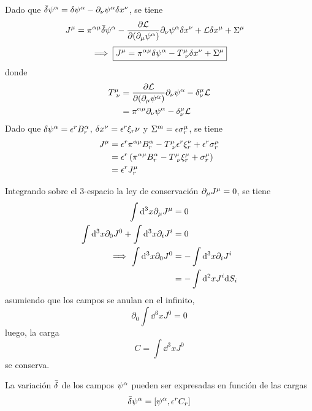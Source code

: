 Dado que $\bar{\delta}\psi^\alpha =\delta\psi^\alpha -\partial_\nu \psi^\alpha \delta x^\nu $, se tiene
\begin{align}
    J^\mu &=\pi ^{\alpha \mu} \bar{\delta}\psi^\alpha -\pdv{\mathcal{L}}{(\partial_\mu\psi^\alpha)}\partial_\nu \psi^\alpha \delta x^\nu +\mathcal{L} \delta x^\mu +\Sigma^\mu 
\end{align}
\begin{equation}
  \implies \boxed{J^\mu =\pi^{\alpha\mu }\delta \psi^\alpha -T^{\mu }_{~\nu }\delta x^\nu +\Sigma^\mu }
\end{equation}
donde
\begin{align}
  T^{\mu }_{~\nu }&=\pdv{\mathcal{L}}{(\partial_\mu\psi^\alpha)}\partial_\nu \psi^\alpha -\delta^\mu_\nu \mathcal{L}\\
  &= \pi^{\alpha\mu }\partial_\nu \psi^\alpha -\delta^\mu_\nu\mathcal{L} 
\end{align}
Dado que $\delta\psi^\alpha =\epsilon^rB_r^\alpha $, $\delta x^\nu =\epsilon^r\xi_r\nu $ y $\Sigma^m =\epsilon\sigma_r^\mu $, se tiene
\begin{align}
  J^\mu &=\epsilon^r\pi^{\alpha\mu }B_r^\alpha -T^\mu _{~\nu }\epsilon^r\xi_r^\nu +\epsilon^r\sigma_r^\mu \\
  &=\epsilon^r \left(\pi^{\alpha\mu }B_r^\alpha -T^\mu _{~\nu }\xi_r^\mu +\sigma_r^\mu \right)\\
  &=\epsilon^rJ_r^\mu 
\end{align}




Integrando sobre el $3$-espacio la ley de conservación $\partial_\mu J^\mu =0$, se tiene
\begin{align}
  \int\dd^3x\partial_\mu J^\mu &=0\\
  \int\dd^3x\partial_0 J^0+\int\dd^3x\partial_iJ^{i}&=0\\
  \implies \int\dd^3x\partial_0 J^0&=-\int\dd^3x\partial_iJ^{i}\\
  &=-\int\dd^2x J^{i}\dd S_i
\end{align}
asumiendo que los campos se anulan en el infinito,
\begin{equation}
  \partial_0\int\dd^3xJ^0=0
\end{equation}
luego, la carga
\begin{equation}
  C=\int\dd^3xJ^0
\end{equation}
se conserva.

\begin{teor}
	La variación $\bar{\delta}$ de los campos $\psi^\alpha $ pueden ser expresadas en función de las cargas
	\begin{equation}
  \bar{\delta}\psi^\alpha =[\psi^\alpha ,\epsilon^rC_r]
\end{equation}
\end{teor}

